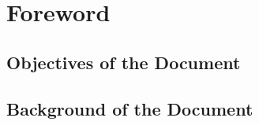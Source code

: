 \chapter{Foreword}
\section*{Objectives of the Document}
\Blindtext
\section*{Background of the Document}
\blindtext